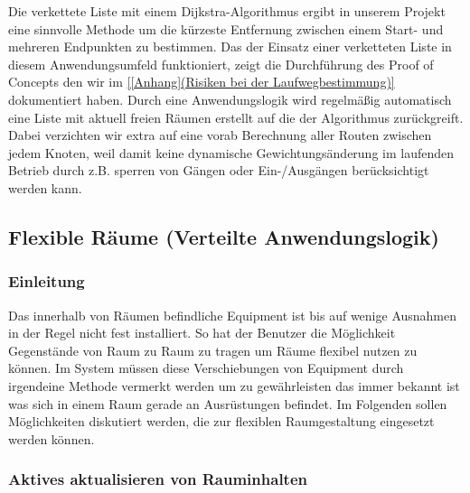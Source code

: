 Die verkettete Liste mit einem Dijkstra-Algorithmus ergibt in unserem Projekt
eine sinnvolle Methode um die kürzeste Entfernung zwischen einem Start- und
mehreren Endpunkten zu bestimmen.
Das der Einsatz einer verketteten Liste in diesem Anwendungsumfeld
funktioniert, zeigt die Durchführung des Proof of Concepts den wir im \ref{[Anhang](Risiken bei der Laufwegbestimmung)}
dokumentiert haben. Durch eine Anwendungslogik wird regelmäßig automatisch
eine Liste mit aktuell freien Räumen erstellt auf die der Algorithmus
zurückgreift. Dabei verzichten wir extra auf eine vorab Berechnung aller
Routen zwischen jedem Knoten, weil damit keine dynamische Gewichtungsänderung
im laufenden Betrieb durch z.B. sperren von Gängen oder Ein-/Ausgängen
berücksichtigt werden kann.


\subsection{Flexible Räume (Verteilte Anwendungslogik)}
\label{sec:Flexible_Räume_(Verteilte_Anwendungslogik)}

\subsubsection{Einleitung}
\label{sec:Flexible_Räume_(Verteilte_Anwendungslogik)_Einleitung}

Das innerhalb von Räumen befindliche Equipment ist bis auf wenige Ausnahmen in
der Regel nicht fest installiert. So hat der Benutzer die Möglichkeit
Gegenstände von Raum zu Raum zu tragen um Räume flexibel nutzen zu können.
Im System müssen diese Verschiebungen von Equipment durch irgendeine Methode
vermerkt werden um zu gewährleisten das immer bekannt ist was sich in einem
Raum gerade an Ausrüstungen befindet. Im Folgenden sollen Möglichkeiten
diskutiert werden, die zur flexiblen Raumgestaltung eingesetzt werden können.

\subsubsection{Aktives aktualisieren von Rauminhalten}
\label{sec:Aktives_aktualisieren_von_Rauminhalten}

